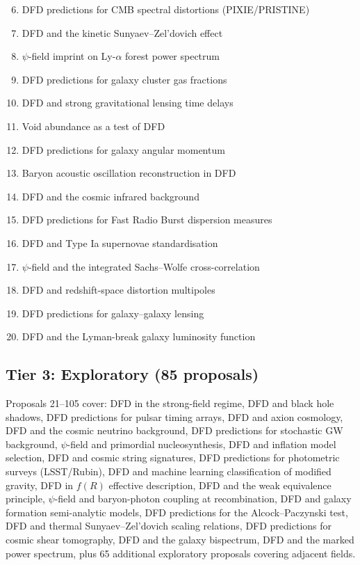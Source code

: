 \documentclass[11pt,a4paper]{article}
\begin{document}
\begin{enumerate}[nosep]
\setcounter{enumi}{5}
\item DFD predictions for CMB spectral distortions (PIXIE/PRISTINE)
\item DFD and the kinetic Sunyaev--Zel'dovich effect
\item $\psi$-field imprint on Ly-$\alpha$ forest power spectrum
\item DFD predictions for galaxy cluster gas fractions
\item DFD and strong gravitational lensing time delays
\item Void abundance as a test of DFD
\item DFD predictions for galaxy angular momentum
\item Baryon acoustic oscillation reconstruction in DFD
\item DFD and the cosmic infrared background
\item DFD predictions for Fast Radio Burst dispersion measures
\item DFD and Type Ia supernovae standardisation
\item $\psi$-field and the integrated Sachs--Wolfe cross-correlation
\item DFD and redshift-space distortion multipoles
\item DFD predictions for galaxy--galaxy lensing
\item DFD and the Lyman-break galaxy luminosity function
\end{enumerate}

\subsection{Tier 3: Exploratory (85 proposals)}

Proposals 21--105 cover: DFD in the strong-field regime, DFD and black hole shadows, DFD predictions for pulsar timing arrays, DFD and axion cosmology, DFD and the cosmic neutrino background, DFD predictions for stochastic GW background, $\psi$-field and primordial nucleosynthesis, DFD and inflation model selection, DFD and cosmic string signatures, DFD predictions for photometric surveys (LSST/Rubin), DFD and machine learning classification of modified gravity, DFD in $f(R)$ effective description, DFD and the weak equivalence principle, $\psi$-field and baryon-photon coupling at recombination, DFD and galaxy formation semi-analytic models, DFD predictions for the Alcock--Paczynski test, DFD and thermal Sunyaev--Zel'dovich scaling relations, DFD predictions for cosmic shear tomography, DFD and the galaxy bispectrum, DFD and the marked power spectrum, plus 65 additional exploratory proposals covering adjacent fields.
\end{document}
